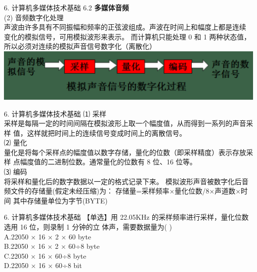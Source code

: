 \documentclass[aspectratio=169]{beamer}
\begin{document}
\begin{frame}[t]{6. 计算机多媒体技术基础} \vspace{20pt}
    6.2 \textbf{多媒体音频}\\
    (2) 音频数字化处理\\
    声波由许多具有不同振幅和频率的正弦波组成。声波在时间上和幅度上都是连续
    变化的模拟信号，可用模拟波形来表示。
    而计算机只能处理 0 和 1 两种状态值，所以必须对连续的模拟声音信号数字化（离散化）\\
    \includegraphics[scale=0.25]{voice_digtial}\\ 
\end{frame}

\begin{frame}[t]{6. 计算机多媒体技术基础} \vspace{20pt}
    ⑴ 采样\\
采样是每隔一定的时间间隔在模拟波形上取一个幅度值，从而得到一系列的声音采样
值，这样就把时间上的连续信号变成时间上的离散信号。\\
⑵ 量化\\
量化是将每个采样点的幅度值以数字存储，量化的位数（即采样精度）表示存放采样
点幅度值的二进制位数。通常量化的位数有 8 位、16 位等。\\
⑶ 编码\\
将采样和量化后的数字数据以一定的格式记录下来。
模拟波形声音被数字化后音频文件的存储量(假定未经压缩)为：
存储量=采样频率×量化位数/8×声道数×时间
其中存储量单位为字节(BYTE)\\

\end{frame}


\begin{frame}[t]{6. 计算机多媒体技术基础} \vspace{20pt}
【单选】用 22.05KHz 的采样频率进行采样，量化位数选用 16 位，则录制 1 分钟的立
体声，需要数据量为( )\\
A.22050 × 16 × 2 × 60 byte\\
B.22050 × 16 × 2 × 60÷8 byte\\
C.22050 × 16 × 60÷8 byte\\
D.22050 × 16 × 60÷8 bit\\
\end{frame}
\end{document}
